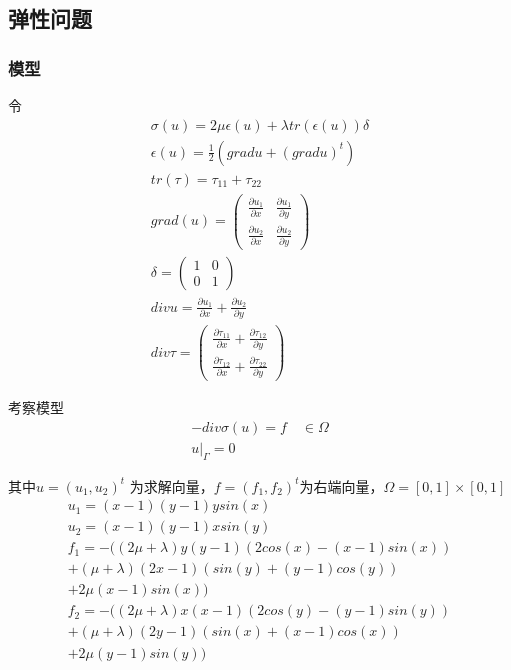 \documentclass[a4paper,UTF8,titlepage]{ctexart}
\begin{document}
\subsection{弹性问题}

\subsubsection{模型}

令
$$
\begin{matrix}
	\sigma(u) = 2 \mu \epsilon(u) + \lambda tr(\epsilon(u)) \delta \\
	\epsilon(u) = \frac{1}{2} (grad u + (grad u)^t) \\
	tr(\tau) = \tau_{11} + \tau_{22} \\
	grad(u) = \begin{pmatrix}
		\frac{\partial u_1}{\partial x} & \frac{\partial u_1}{\partial y} \\
		\frac{\partial u_2}{\partial x} &
		\frac{\partial u_2}{\partial y}
	\end{pmatrix} \\
	\delta = \begin{pmatrix}
		1 & 0 \\
		0 & 1
	\end{pmatrix} \\
	div u = \frac{\partial u_1}{\partial x} + \frac{\partial u_2}{\partial y} \\
	div \tau = \begin{pmatrix}
		\frac{\partial \tau_{11}}{\partial x} + \frac{\partial \tau_{12}}{\partial y} \\
		\frac{\partial \tau_{12}}{\partial x} + \frac{\partial \tau_{22}}{\partial 
		y}
	\end{pmatrix}
\end{matrix}
$$

考察模型
$$
\begin{matrix}
	-div \sigma(u) = f \quad \in \Omega  \\
	u |_{\Gamma} = 0
\end{matrix}
$$ 
\par
其中$ u = (u_1,u_2)^t $ 为求解向量，$ f = (f_1,f_2)^t $为右端向量，$ \Omega = [0,1] \times [0,1] $
$$
\begin{matrix}
	u_1 = (x - 1)(y - 1) y sin(x) 
	\\
	u_2 = (x - 1)(y - 1) x sin(y) 
	\\
	f_1 = -((2 \mu + \lambda) y (y - 1) (2 cos(x) - (x - 1) sin(x)) \\
	+ (\mu + \lambda) (2 x - 1) (sin(y) + (y - 1) cos(y)) \\
	+ 2 \mu (x - 1) sin(x)) 
	\\
	f_2 = -((2 \mu + \lambda) x (x - 1) (2 cos(y) - (y - 1) sin(y)) \\
	+ (\mu + \lambda) (2 y - 1) (sin(x) + (x - 1) cos(x)) \\ 
	+ 2 \mu (y - 1) sin(y))
\end{matrix}
$$
\end{document}
